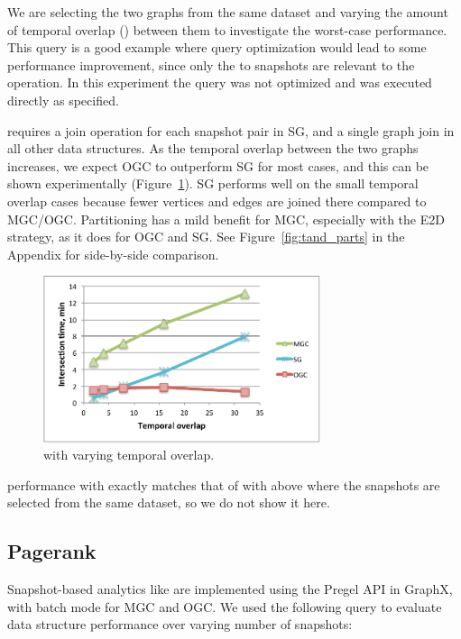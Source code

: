 We are selecting the two graphs from the same dataset and varying the
amount of temporal overlap () between them to investigate
the worst-case performance.  This query is a good example where query
optimization would lead to some performance improvement, since only
the  to  snapshots are relevant to the operation.
In this experiment the query was not optimized and was executed
directly as specified.

 requires a join operation for each snapshot pair in SG,
and a single graph join in all other data structures.  As the temporal
overlap between the two graphs increases, we expect OGC to outperform
SG for most cases, and this can be shown experimentally
(Figure~\ref{fig:tandall}).  SG performs well on the small temporal
overlap cases because fewer vertices and edges are joined there
compared to MGC/OGC.  Partitioning has a mild benefit for MGC,
especially with the E2D strategy, as it does for OGC and SG. See
Figure~\ref{fig:tand_parts} in the Appendix for side-by-side
comparison.

\begin{figure}[t!]
\includegraphics[width=3.2in]{figs/tand_all_warm.pdf}
\caption{ with varying temporal overlap.}
\label{fig:tandall}
\end{figure}

 performance with  exactly matches that of
 with  above where the snapshots are selected
from the same dataset, so we do not show it here.

\subsection{Pagerank}

Snapshot-based analytics like  are implemented using
the Pregel API in GraphX, with batch mode for MGC and OGC.  We used
the following query to evaluate data structure performance over
varying number of snapshots:

